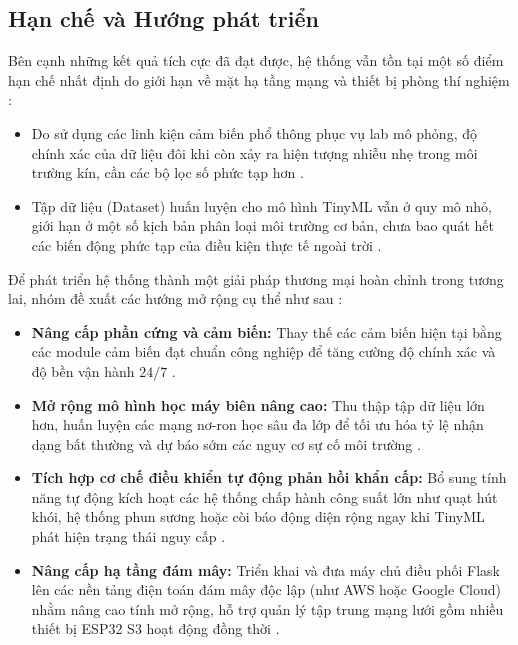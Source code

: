 \subsection{Hạn chế và Hướng phát triển}
Bên cạnh những kết quả tích cực đã đạt được, hệ thống vẫn tồn tại một số điểm hạn chế nhất định do giới hạn về mặt hạ tầng mạng và thiết bị phòng thí nghiệm \cite{cite: 134}:
\begin{itemize}
    \item Do sử dụng các linh kiện cảm biến phổ thông phục vụ lab mô phỏng, độ chính xác của dữ liệu đôi khi còn xảy ra hiện tượng nhiễu nhẹ trong môi trường kín, cần các bộ lọc số phức tạp hơn \cite{cite: 496, cite: 499}.
    \item Tập dữ liệu (Dataset) huấn luyện cho mô hình TinyML vẫn ở quy mô nhỏ, giới hạn ở một số kịch bản phân loại môi trường cơ bản, chưa bao quát hết các biến động phức tạp của điều kiện thực tế ngoài trời \cite{cite: 135, cite: 138}.
\end{itemize}

Để phát triển hệ thống thành một giải pháp thương mại hoàn chỉnh trong tương lai, nhóm đề xuất các hướng mở rộng cụ thể như sau \cite{cite: 510}:
\begin{itemize}
    \item \textbf{Nâng cấp phần cứng và cảm biến:} Thay thế các cảm biến hiện tại bằng các module cảm biến đạt chuẩn công nghiệp để tăng cường độ chính xác và độ bền vận hành $24/7$ \cite{cite: 511, cite: 181}.
    \item \textbf{Mở rộng mô hình học máy biên nâng cao:} Thu thập tập dữ liệu lớn hơn, huấn luyện các mạng nơ-ron học sâu đa lớp để tối ưu hóa tỷ lệ nhận dạng bất thường và dự báo sớm các nguy cơ sự cố môi trường \cite{cite: 512}.
    \item \textbf{Tích hợp cơ chế điều khiển tự động phản hồi khẩn cấp:} Bổ sung tính năng tự động kích hoạt các hệ thống chấp hành công suất lớn như quạt hút khói, hệ thống phun sương hoặc còi báo động diện rộng ngay khi TinyML phát hiện trạng thái nguy cấp \cite{cite: 515}.
    \item \textbf{Nâng cấp hạ tầng đám mây:} Triển khai và đưa máy chủ điều phối Flask lên các nền tảng điện toán đám mây độc lập (như AWS hoặc Google Cloud) nhằm nâng cao tính mở rộng, hỗ trợ quản lý tập trung mạng lưới gồm nhiều thiết bị ESP32 S3 hoạt động đồng thời \cite{cite: 514, cite: 516}.
\end{itemize}
